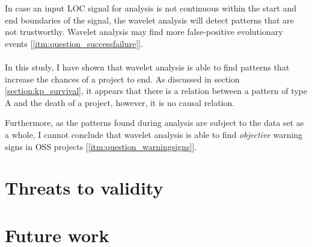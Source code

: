 In case an input LOC signal for analysis is not continuous within the start
and end boundaries of the signal, the wavelet analysis will detect patterns
that are not trustworthy. Wavelet analysis may find more false-positive
evolutionary events [\ref{itm:question_successfailure}].

\paragraph{}
In this study, I have shown that wavelet analysis is able to find patterns that
increase the chances of a project to end. As discussed in section
\ref{section:kp_survival}, it appears that there is a relation between a
pattern of type A and the death of a project, however, it is no causal
relation.

Furthermore, as the patterns found during analysis are subject to the data set
as a whole, I cannot conclude that wavelet analysis is able to find
\emph{objective }\rm warning signs in OSS projects
[\ref{itm:question_warningsigns}].

\section{Threats to validity}
\begin{comment}
* Is the Ohloh database a representation of the world of OSS projects?
* Is LOC as the sum of source lines of code, comments, and blank lines valid?
* The use of LOC as a measure of project evolution. Does it represent
activity/growth/whatever to say something about the project's status?
* A selection criterion for the projects was a continuous series of subsequent
monthly facts. Maybe the full series of evolution data of a project is needed in
order to find objective signs or to be able to compare different projects.
* Is 250 projects enough to detect patterns and generalise to the world of OSS
projects?
* Is monthly aggregated data fine-grained enough?

\end{comment}

\section{Future work}

